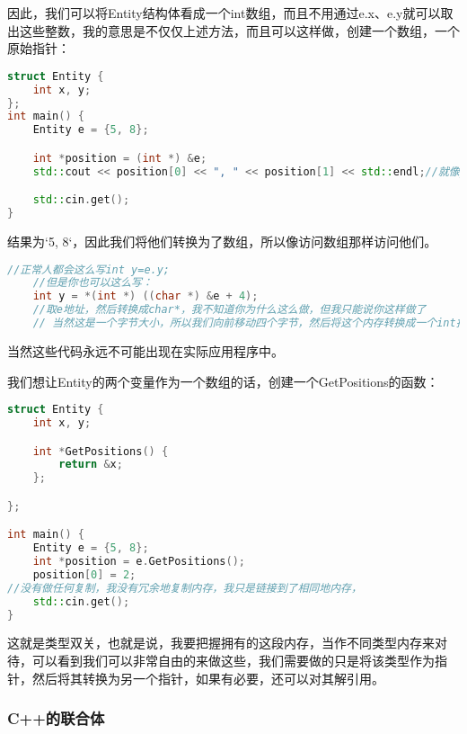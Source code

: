 因此，我们可以将{\ncodestyle Entity}结构体看成一个{\ncodestyle int}数组，而且不用通过{\ncodestyle e.x}、{\ncodestyle e.y}就可以取出这些整数，我的意思是不仅仅上述方法，而且可以这样做，创建一个数组，一个原始指针：

\begin{lstlisting}[language=c++]
struct Entity {
    int x, y;
};
int main() {
    Entity e = {5, 8};

    int *position = (int *) &e;
    std::cout << position[0] << ", " << position[1] << std::endl;//就像position是一个数组一样

    std::cin.get();
}
\end{lstlisting}
结果为`5, 8`，因此我们将他们转换为了数组，所以像访问数组那样访问他们。

\begin{lstlisting}[language=c++]
    //正常人都会这么写int y=e.y;
    //但是你也可以这么写：
    int y = *(int *) ((char *) &e + 4);
    //取e地址，然后转换成char*，我不知道你为什么这么做，但我只能说你这样做了
    // 当然这是一个字节大小，所以我们向前移动四个字节，然后将这个内存转换成一个int指针，然后解引用，然后就得到了y
\end{lstlisting}
当然这些代码永远不可能出现在实际应用程序中。

我们想让Entity的两个变量作为一个数组的话，创建一个GetPositions的函数：
\begin{lstlisting}[language=c++]
struct Entity {
    int x, y;

    int *GetPositions() {
        return &x;
    };

};

int main() {
    Entity e = {5, 8};
    int *position = e.GetPositions();
    position[0] = 2;
//没有做任何复制，我没有冗余地复制内存，我只是链接到了相同地内存，
    std::cin.get();
}
\end{lstlisting}

这就是类型双关，也就是说，我要把握拥有的这段内存，当作不同类型内存来对待，可以看到我们可以非常自由的来做这些，我们需要做的只是将该类型作为指针，然后将其转换为另一个指针，如果有必要，还可以对其解引用。

\subsubsection{C++的联合体}


